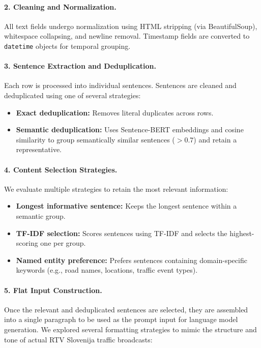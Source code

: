 \paragraph{2. Cleaning and Normalization.}
All text fields undergo normalization using HTML stripping (via BeautifulSoup), whitespace collapsing, and newline removal. Timestamp fields are converted to \texttt{datetime} objects for temporal grouping.

\paragraph{3. Sentence Extraction and Deduplication.}
Each row is processed into individual sentences. Sentences are cleaned and deduplicated using one of several strategies:
\begin{itemize}
  \item \textbf{Exact deduplication:} Removes literal duplicates across rows.
  \item \textbf{Semantic deduplication:} Uses Sentence-BERT embeddings and cosine similarity to group semantically similar sentences ($> 0.7$) and retain a representative.
\end{itemize}

\paragraph{4. Content Selection Strategies.}
We evaluate multiple strategies to retain the most relevant information:
\begin{itemize}
  \item \textbf{Longest informative sentence:} Keeps the longest sentence within a semantic group.
  \item \textbf{TF-IDF selection:} Scores sentences using TF-IDF and selects the highest-scoring one per group.
  \item \textbf{Named entity preference:} Prefers sentences containing domain-specific keywords (e.g., road names, locations, traffic event types).
\end{itemize}

\paragraph{5. Flat Input Construction.}
Once the relevant and deduplicated sentences are selected, they are assembled into a single paragraph to be used as the prompt input for language model generation. We explored several formatting strategies to mimic the structure and tone of actual RTV Slovenija traffic broadcasts:

